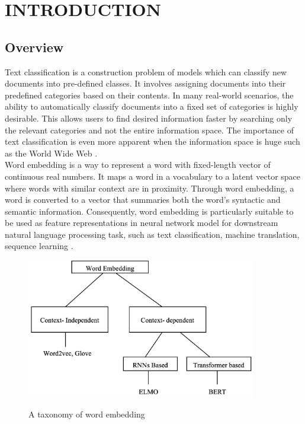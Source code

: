 \chapter{INTRODUCTION}
\section{Overview}
\vspace{20pt}
Text classification is a construction problem of models which can classify new documents into pre-defined classes. It involves assigning documents into their predefined categories based on their contents. In many real-world scenarios, the ability to automatically classify documents into a fixed set of categories is highly desirable. This allows users to find desired information faster by searching only the relevant categories and not the entire information space. The importance of text classification is even more apparent when the information space is huge such as the World Wide Web \cite{ajose2020performance}.\\
Word embedding is a way to represent a word with fixed-length vector of continuous real numbers. It maps a word in a vocabulary to a latent vector space where words with similar context are in proximity. Through word embedding, a word is converted to a vector that summaries both the word’s syntactic and semantic information. Consequently, word embedding is particularly suitable to be used as feature representations in neural network model for downstream natural language processing task, such as text classification, machine translation, sequence learning \cite{bhoir2017comparative}.\\
\begin{figure}
  \centering 
  \vspace{20pt}\includegraphics[width=10cm]{images/intro.png}\\
  \caption{A taxonomy of word embedding} 
  \label{fig:taxonomy}
\end{figure}
